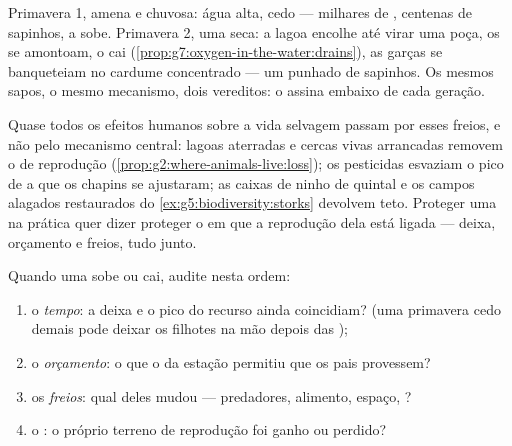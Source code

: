 \begin{example}\label{ex:g8:reproduction-and-environment:twosprings}
Primavera 1, amena e chuvosa: água alta,  cedo --- milhares de
, centenas de sapinhos, a  sobe. Primavera 2, uma seca: a
lagoa encolhe até virar uma poça, os  se amontoam, o 
cai (\cref{prop:g7:oxygen-in-the-water:drains}), as garças se
banqueteiam no cardume concentrado --- um punhado de sapinhos. Os
mesmos sapos, o mesmo mecanismo, dois vereditos: o  assina
embaixo de cada geração.
\end{example}

\begin{remark}\label{rem:g8:reproduction-and-environment:humans}
Quase todos os efeitos humanos sobre a vida selvagem passam por esses
freios, e não pelo mecanismo central: lagoas aterradas e cercas vivas
arrancadas removem o  de reprodução
(\cref{prop:g2:where-animals-live:loss}); os pesticidas esvaziam o
pico de  a que os chapins se ajustaram; as caixas de ninho de
quintal e os campos alagados restaurados do
\cref{ex:g5:biodiversity:storks} devolvem teto. Proteger uma 
na prática quer dizer proteger o  em que a reprodução dela
está ligada --- deixa, orçamento e freios, tudo junto.
\end{remark}

\begin{method}\label{met:g8:reproduction-and-environment:audit}
Quando uma  sobe ou cai, audite nesta ordem:
\begin{enumerate}
  \item o \emph{tempo}: a deixa e o pico do recurso ainda coincidiam?
        (uma primavera cedo demais pode deixar os filhotes na mão
        depois das );
  \item o \emph{orçamento}: o que o  da estação permitiu que
        os pais provessem?
  \item os \emph{freios}: qual deles mudou --- predadores, alimento,
        espaço, ?
  \item o \emph{}: o próprio terreno de reprodução foi ganho
        ou perdido?
\end{enumerate}
\end{method}

